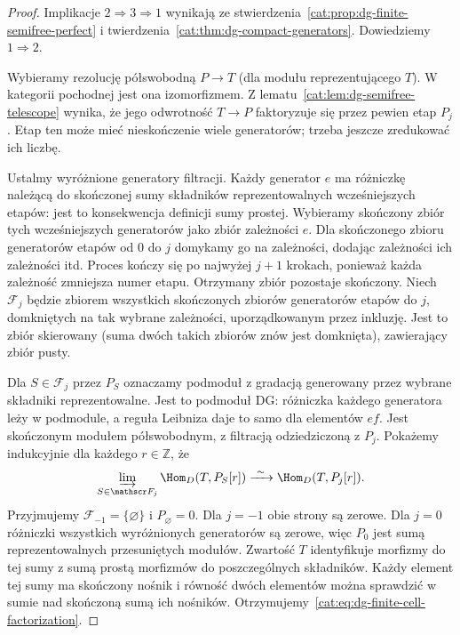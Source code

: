 \begin{proof}
Implikacje $2\Rightarrow3\Rightarrow1$ wynikają ze stwierdzenia~\ref{cat:prop:dg-finite-semifree-perfect} i twierdzenia~\ref{cat:thm:dg-compact-generators}. Dowiedziemy $1\Rightarrow2$.

Wybieramy rezolucję półswobodną $P\to T$ (dla modułu reprezentującego $T$). W kategorii pochodnej jest ona izomorfizmem. Z lematu~\ref{cat:lem:dg-semifree-telescope} wynika, że jego odwrotność $T\to P$ faktoryzuje się przez pewien etap $P_j$. Etap ten może mieć nieskończenie wiele generatorów; trzeba jeszcze zredukować ich liczbę.

Ustalmy wyróżnione generatory filtracji. Każdy generator $e$ ma różniczkę należącą do skończonej sumy składników reprezentowalnych wcześniejszych etapów: jest to konsekwencja definicji sumy prostej. Wybieramy skończony zbiór tych wcześniejszych generatorów jako zbiór zależności $e$. Dla skończonego zbioru generatorów etapów od $0$ do $j$ domykamy go na zależności, dodając zależności ich zależności itd. Proces kończy się po najwyżej $j+1$ krokach, ponieważ każda zależność zmniejsza numer etapu. Otrzymany zbiór pozostaje skończony. Niech $\mathscr F_j$ będzie zbiorem wszystkich skończonych zbiorów generatorów etapów do $j$, domkniętych na tak wybrane zależności, uporządkowanym przez inkluzję. Jest to zbiór skierowany (suma dwóch takich zbiorów znów jest domknięta), zawierający zbiór pusty.

Dla $S\in\mathscr F_j$ przez $P_S$ oznaczamy podmoduł z gradacją generowany przez wybrane składniki reprezentowalne. Jest to podmoduł DG: różniczka każdego generatora leży w podmodule, a reguła Leibniza daje to samo dla elementów $ef$. Jest skończonym modułem półswobodnym, z filtracją odziedziczoną z $P_j$. Pokażemy indukcyjnie dla każdego $r\in\mathbb Z$, że
\begin{equation}\label{cat:eq:dg-finite-cell-factorization}
 \varinjlim_{S\in\mathscr F_j}\Hom_D(T,P_S[r])
 \xrightarrow{\ \sim\ }\Hom_D(T,P_j[r]).
\end{equation}
Przyjmujemy $\mathscr F_{-1}=\{\varnothing\}$ i $P_\varnothing=0$. Dla $j=-1$ obie strony są zerowe. Dla $j=0$ różniczki wszystkich wyróżnionych generatorów są zerowe, więc $P_0$ jest sumą reprezentowalnych przesuniętych modułów. Zwartość $T$ identyfikuje morfizmy do tej sumy z sumą prostą morfizmów do poszczególnych składników. Każdy element tej sumy ma skończony nośnik i równość dwóch elementów można sprawdzić w sumie nad skończoną sumą ich nośników. Otrzymujemy~\eqref{cat:eq:dg-finite-cell-factorization}.


\end{proof}
